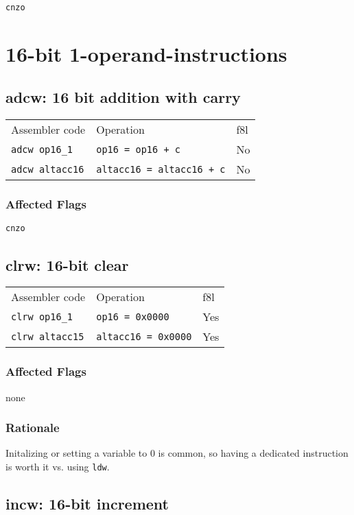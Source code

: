\documentclass{book}
\begin{document}
\texttt{cnzo}


\section{16-bit 1-operand-instructions}

\subsection{adcw: 16 bit addition with carry}

\begin{tabular}{l l l}
Assembler code         & Operation                        & f8l \\
\texttt{adcw op16\_1}  & \texttt{op16 = op16 + c}         & No \\
\texttt{adcw altacc16} & \texttt{altacc16 = altacc16 + c} & No
\end{tabular}

\subsubsection*{Affected Flags}

\texttt{cnzo}


\subsection{clrw: 16-bit clear}

\begin{tabular}{l l l}
Assembler code         & Operation                  & f8l \\
\texttt{clrw op16\_1}  & \texttt{op16 = 0x0000}     & Yes \\
\texttt{clrw altacc15} & \texttt{altacc16 = 0x0000} & Yes
\end{tabular}

\subsubsection*{Affected Flags}

none

\subsubsection*{Rationale}

Initalizing or setting a variable to 0 is common, so having a dedicated instruction is worth it vs. using \texttt{ldw}.


\subsection{incw: 16-bit increment}
\end{document}
